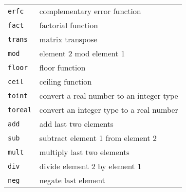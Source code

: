 \documentclass[11pt,notitlepage]{article}
\begin{document}
\begin{center}
\begin{tabular}[t]{|l|l|}
      {\tt erfc} & complementary error function \\
      {\tt fact} & factorial function \\
      {\tt trans} & matrix transpose \\
      {\tt mod} & element 2 mod element 1 \\
      {\tt floor} & floor function \\
      {\tt ceil} & ceiling function \\
      {\tt toint} & convert a real number to an integer type \\
      {\tt toreal} & convert an integer type to a real number \\
      {\tt add} & add last two elements \\
      {\tt sub} & subtract element 1 from element 2 \\
      {\tt mult} & multiply last two elements \\
      {\tt div} & divide element 2 by element 1 \\
      {\tt neg} & negate last element \\
      \hline
   \end{tabular}
\end{center}
\end{document}
